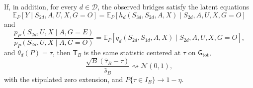 If, in addition, for every \(d\in\mathcal D\), the observed bridges satisfy the latent equations
\[
 \mathbb E_P[Y\mid S_{2d},A,U,X,G=O]
 =\mathbb E_P[h_d(S_{3d},S_{2d},A,X)\mid S_{2d},A,U,X,G=O]
\]
and
\[
 \frac{p_P(S_{2d},U,X\mid A,G=E)}{p_P(S_{2d},U,X\mid A,G=O)}
 =\mathbb E_P[q_d(S_{2d},S_{1d},A,X)\mid S_{2d},A,U,X,G=O],
\]
and \(\theta_d(P)=\tau\), then \(\mathsf T_B\) is the same statistic centered at \(\tau\) on \(\mathsf G_{\mathrm{tot}}\),
\[
 \frac{\sqrt B(\widehat\tau_B-\tau)}{\widehat s_B}
 \rightsquigarrow\mathcal N(0,1),
\]
with the stipulated zero extension, and \(P\{\tau\in I_B\}\to1-\eta\).